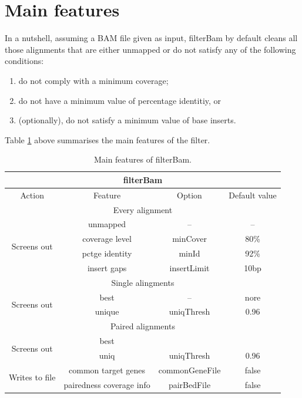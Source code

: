 \documentclass[11pt]{article}
\begin{document}
{\section{Main features}

In a nutshell, assuming a BAM file given as input, filterBam by default cleans all those alignments that are either unmapped or do not satisfy any of the following conditions:  
\begin{enumerate}
	\item	do not comply with a minimum coverage;
	\item	do not have a minimum value of percentage identitiy, or 
	\item	(optionally), do not satisfy a minimum value of base inserts. 
\end{enumerate} 
Table \ref{tab:featuresFilter} above summarises the main features of the filter. 

\begin{table}
  \begin{center}
    \begin{tabular} {|c|c|c|c|} \hline
	 \multicolumn{4}{|c|}{\textbf{filterBam}} \\ \hline
      Action & Feature & Option & Default value \\ \hline 
      \multicolumn{4}{|c|}{Every alignment} \\ \hline
      \multirow{4}{*}{Screens out} & unmapped & -- &  -- \\ \cline{2-4}
      & coverage level & minCover & 80\% \\  \cline{2-4}
      & pctge identity & minId & 92\%\\  \cline{2-4}
      & insert gaps & insertLimit & 10bp\\ \hline
      \multicolumn{4}{|c|}{Single alingments} \\ \hline
      \multirow{2}{*}{Screens out} & best & -- & nore \\ \cline{2-4}
      & unique & uniqThresh & 0.96 \\ \hline
      \multicolumn{4}{|c|}{Paired alignments} \\ \hline
      \multirow{2}{*}{Screens out} & best & & \\  \cline{2-4}
      & uniq & uniqThresh & 0.96 \\ \hline
      \multirow{2}{*}{Writes to file} & common target genes & commonGeneFile & false \\  \cline{2-4} 
      & pairedness coverage info & pairBedFile & false \\ \hline
    \end{tabular}
    \caption{Main features of filterBam.}
    \label{tab:featuresFilter}
  \end{center}
\end{table}

}
\end{document}
